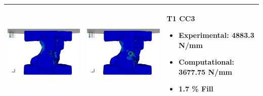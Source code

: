 \documentclass[11pt,a4paper]{article}
\begin{document}
\begin{landscape}
\begin{longtable}{|m{11cm}|m{11cm}|m{4cm}|}
\includegraphics[width=10cm]{images/T1_CC3_postVP_Interface_ABAQUS_All_Side_Stress.png}   & \includegraphics[width=10cm]{images/T1_CC3_postVP_Interface_ABAQUS_All_Side_Strain.png}   & T1 CC3  \begin{itemize} \item Experimental: 	4883.3	N/mm \item Computational:	3677.75 N/mm \item 1.7 \% Fill \end{itemize} \\ \hline 

\end{longtable}
\end{landscape}
\end{document}
